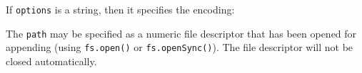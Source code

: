 If \texttt{options} is a string, then it specifies the encoding:

\begin{Shaded}
\begin{Highlighting}[]
 \OperatorTok{;}

\NormalTok{(}\OperatorTok{,} \OperatorTok{,} \OperatorTok{,}\OperatorTok{;}
\end{Highlighting}
\end{Shaded}

The \texttt{path} may be specified as a numeric file descriptor that has
been opened for appending (using \texttt{fs.open()} or
\texttt{fs.openSync()}). The file descriptor will not be closed
automatically.

\begin{Shaded}
\begin{Highlighting}[]
\OperatorTok{,}\OperatorTok{,} \OperatorTok{;}

 
  \OperatorTok{,}\KeywordTok{=\textgreater{}}\NormalTok{ \{}
    \OperatorTok{;}
\NormalTok{  \})}\OperatorTok{;}
\NormalTok{\}}

\NormalTok{(}\OperatorTok{,} \OperatorTok{,}\OperatorTok{,}\KeywordTok{=\textgreater{}}\NormalTok{ \{}
  \OperatorTok{;}

  \NormalTok{ \{}
    \OperatorTok{,} \OperatorTok{,} \OperatorTok{,}\KeywordTok{=\textgreater{}}\NormalTok{ \{}
      \OperatorTok{;}
      \OperatorTok{;}
\NormalTok{    \})}\OperatorTok{;}
\NormalTok{  \} }
    \OperatorTok{;}
    \OperatorTok{;}
\NormalTok{  \}}
\NormalTok{\})}\OperatorTok{;}
\end{Highlighting}
\end{Shaded}

